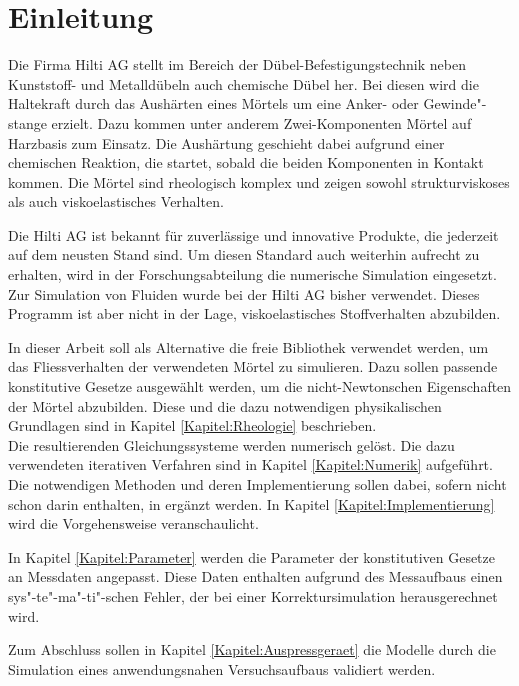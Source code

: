 \section{Einleitung}
\label{Kapitel:Einleitung}
Die Firma Hilti AG stellt im Bereich der Dübel-Befestigungstechnik neben Kunststoff- und Metalldübeln auch chemische Dübel her. Bei diesen wird die Haltekraft durch das Aushärten eines Mörtels um eine Anker- oder Gewinde"-stange erzielt.
Dazu kommen unter anderem Zwei-Komponenten Mörtel auf Harzbasis zum Einsatz. Die Aushärtung geschieht dabei aufgrund einer chemischen Reaktion, die startet, sobald die beiden Komponenten in Kontakt kommen.
Die Mörtel sind rheologisch komplex und zeigen sowohl strukturviskoses als auch viskoelastisches Verhalten.

Die Hilti AG ist bekannt für zuverlässige und innovative Produkte, die je\-der\-zeit auf dem neusten Stand sind. Um diesen Standard auch weiterhin aufrecht zu erhalten, wird in der Forschungsabteilung die numerische Simulation eingesetzt.
Zur Simulation von Fluiden wurde bei der Hilti AG bisher \cfx{} verwendet. Dieses Programm ist aber nicht in der Lage, viskoelastisches Stoffverhalten abzubilden.

In dieser Arbeit soll als Alternative die freie Bibliothek \openfoam{} verwendet werden, um das Fliessverhalten der verwendeten Mörtel zu simulieren.
Dazu sollen passende konstitutive Gesetze ausgewählt werden, um die nicht-Newtonschen Eigenschaften der Mörtel abzubilden. Diese und die dazu notwendigen physikalischen Grundlagen sind in Kapitel \ref{Kapitel:Rheologie} beschrieben.\\
Die resultierenden Gleichungssysteme werden numerisch gelöst. Die dazu verwendeten iterativen Verfahren sind in Kapitel \ref{Kapitel:Numerik} aufgeführt.
Die notwendigen Methoden und deren Implementierung sollen dabei, sofern nicht schon darin enthalten, in \openfoam{} ergänzt werden. In Kapitel \ref{Kapitel:Implementierung} wird die Vorgehensweise veranschaulicht.

In Kapitel \ref{Kapitel:Parameter} werden die Parameter der konstitutiven Gesetze an Messdaten angepasst. Diese Daten enthalten aufgrund des Messaufbaus einen sys"-te"-ma"-ti"-schen Fehler, der bei einer Korrektursimulation herausgerechnet wird.

Zum Abschluss sollen in Kapitel \ref{Kapitel:Auspressgeraet} die Modelle durch die Simulation eines anwendungsnahen Versuchsaufbaus validiert werden.
